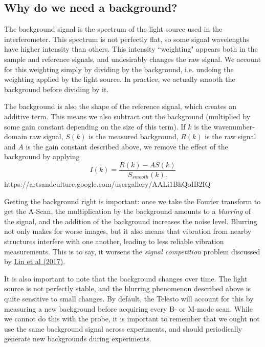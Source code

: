 \documentclass{article}
\begin{document}
\subsection{Why do we need a background?}

\par{The background signal is the spectrum of the light source used in the interferometer. This spectrum is not perfectly flat, so some signal wavelengths have higher intensity than others. This intensity ``weighting" appears both in the sample and reference signals, and undesirably changes the raw signal. We account for this weighting simply by dividing by the background, i.e. undoing the weighting applied by the light source. In practice, we actually smooth the background before dividing by it.}
\par{The background is also the shape of the reference signal, which creates an additive term. This means we also subtract out the background (multiplied by some gain constant depending on the size of this term). If $k$ is the wavenumber-domain raw signal, $S(k)$ is the measured background, $R(k)$ is the raw signal and $A$ is the gain constant described above, we remove the effect of the background by applying
	\begin{equation}
		I(k) = \frac{R(k)-A S(k)}{S_{smooth}(k).}
	\end{equation}https://artsandculture.google.com/usergallery/AALi1BhQoIB2IQ
}
\par{Getting the background right is important: once we take the Fourier transform to get the A-Scan, the multiplication by the background amounts to a \textit{blurring} of the signal, and the addition of the background increases the noise level. Blurring not only makes for worse images, but it also means that vibration from nearby structures interfere with one another, leading to less reliable vibration measurements. This is to say, it worsens the \textit{signal competition} problem discussed by \href{https://doi.org/10.1121/1.4973867}{Lin et al (2017)}.}
\par{It is also important to note that the background changes over time. The light source is not perfectly stable, and the blurring phenomenon described above is quite sensitive to small changes. By default, the Telesto will account for this by measuring a new background before acquiring every B- or M-mode scan. While we cannot do this with the probe, it is important to remember that we ought not use the same background signal across experiments, and should periodically generate new backgrounds during experiments.}
\end{document}
